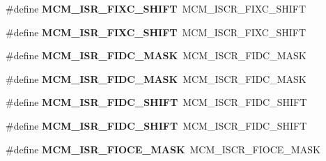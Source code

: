 \begin{DoxyCompactItemize}
\item 
\#define {\bfseries M\+C\+M\+\_\+\+I\+S\+R\+\_\+\+F\+I\+X\+C\+\_\+\+S\+H\+I\+FT}~M\+C\+M\+\_\+\+I\+S\+C\+R\+\_\+\+F\+I\+X\+C\+\_\+\+S\+H\+I\+FT\hypertarget{group__Backward__Compatibility__Symbols_ga2655b9e638b37e397318822fad7cf222}{}\label{group__Backward__Compatibility__Symbols_ga2655b9e638b37e397318822fad7cf222}

\item 
\#define {\bfseries M\+C\+M\+\_\+\+I\+S\+R\+\_\+\+F\+I\+X\+C\+\_\+\+S\+H\+I\+FT}~M\+C\+M\+\_\+\+I\+S\+C\+R\+\_\+\+F\+I\+X\+C\+\_\+\+S\+H\+I\+FT\hypertarget{group__Backward__Compatibility__Symbols_ga2655b9e638b37e397318822fad7cf222}{}\label{group__Backward__Compatibility__Symbols_ga2655b9e638b37e397318822fad7cf222}

\item 
\#define {\bfseries M\+C\+M\+\_\+\+I\+S\+R\+\_\+\+F\+I\+D\+C\+\_\+\+M\+A\+SK}~M\+C\+M\+\_\+\+I\+S\+C\+R\+\_\+\+F\+I\+D\+C\+\_\+\+M\+A\+SK\hypertarget{group__Backward__Compatibility__Symbols_gae47ebe0808b7997f475825af2dfe3636}{}\label{group__Backward__Compatibility__Symbols_gae47ebe0808b7997f475825af2dfe3636}

\item 
\#define {\bfseries M\+C\+M\+\_\+\+I\+S\+R\+\_\+\+F\+I\+D\+C\+\_\+\+M\+A\+SK}~M\+C\+M\+\_\+\+I\+S\+C\+R\+\_\+\+F\+I\+D\+C\+\_\+\+M\+A\+SK\hypertarget{group__Backward__Compatibility__Symbols_gae47ebe0808b7997f475825af2dfe3636}{}\label{group__Backward__Compatibility__Symbols_gae47ebe0808b7997f475825af2dfe3636}

\item 
\#define {\bfseries M\+C\+M\+\_\+\+I\+S\+R\+\_\+\+F\+I\+D\+C\+\_\+\+S\+H\+I\+FT}~M\+C\+M\+\_\+\+I\+S\+C\+R\+\_\+\+F\+I\+D\+C\+\_\+\+S\+H\+I\+FT\hypertarget{group__Backward__Compatibility__Symbols_ga950f918e04715fa01ac699606ae0e803}{}\label{group__Backward__Compatibility__Symbols_ga950f918e04715fa01ac699606ae0e803}

\item 
\#define {\bfseries M\+C\+M\+\_\+\+I\+S\+R\+\_\+\+F\+I\+D\+C\+\_\+\+S\+H\+I\+FT}~M\+C\+M\+\_\+\+I\+S\+C\+R\+\_\+\+F\+I\+D\+C\+\_\+\+S\+H\+I\+FT\hypertarget{group__Backward__Compatibility__Symbols_ga950f918e04715fa01ac699606ae0e803}{}\label{group__Backward__Compatibility__Symbols_ga950f918e04715fa01ac699606ae0e803}

\item 
\#define {\bfseries M\+C\+M\+\_\+\+I\+S\+R\+\_\+\+F\+I\+O\+C\+E\+\_\+\+M\+A\+SK}~M\+C\+M\+\_\+\+I\+S\+C\+R\+\_\+\+F\+I\+O\+C\+E\+\_\+\+M\+A\+SK\hypertarget{group__Backward__Compatibility__Symbols_ga8c2d933b91a6be29be3c45a9120d1a6d}{}\label{group__Backward__Compatibility__Symbols_ga8c2d933b91a6be29be3c45a9120d1a6d}


\end{DoxyCompactItemize}
